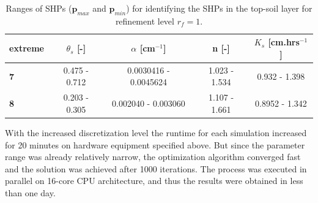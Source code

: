 \documentclass[review]{elsarticle}
\renewcommand{\vec}{\mathbf}
\begin{document}
\begin{table}[ht]
\begin{center}
\caption{Ranges of SHPs ($\vec{p}_{max}$ and $\vec{p}_{min}$) for identifying the SHPs in the top-soil layer for { refinement level} $r_f=1$. }
\begin{small}
\doublespacing
\begin{tabular}{ l || c | c| c| c }
\toprule
extreme & $\theta_s$ [-]&$\alpha$ [cm$^{-1}$]&n [-]& $K_s$ [cm.hrs$^{-1}$]  \\ \hline
\toprule
{\bf 7} & 0.475 - 0.712 & \num{.0030416} - \num{.0045624} & 1.023 - 1.534 & 0.932 - 1.398 \\
{\bf 8} & 0.203 - 0.305 & \num{.002040} - \num{.003060} & 1.107 - 1.661 & 0.8952 - 1.342  \\
\toprule
\end{tabular}
\end{small}
\label{rozsahy2}
\end{center}
\end{table}

With the increased discretization level the runtime for each simulation increased for 20 minutes on hardware equipment specified above. But since the parameter range was already relatively narrow, the optimization algorithm converged fast and the solution was achieved after 1000 iterations. The process was executed in parallel on 16-core CPU architecture, and thus the results were obtained in less than one day.
\end{document}
